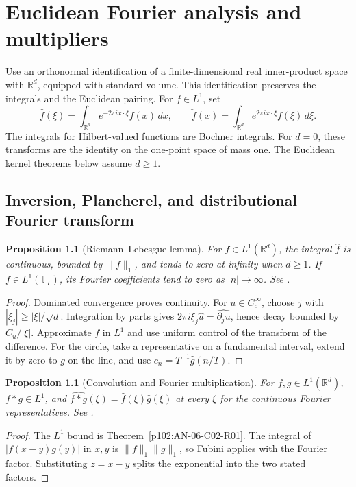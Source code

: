\documentclass[11pt,oneside,openany]{book}
\newtheorem{proposition}[theorem]{Proposition}
\theoremstyle{definition}
\theoremstyle{remark}
\begin{document}
\chapter{Euclidean Fourier analysis and multipliers}
\label{p102:chapter-u3}

Use an orthonormal identification of a finite-dimensional real inner-product space with \(\mathbb R^d\), equipped with standard volume. This identification preserves the integrals and the Euclidean pairing. For \(f\in L^1\), set
\[
 \widehat f(\xi)=\int_{\mathbb R^d}e^{-2\pi i x\cdot\xi}f(x)\,dx,
 \qquad
 \check f(x)=\int_{\mathbb R^d}e^{2\pi i x\cdot\xi}f(\xi)\,d\xi.
\]
The integrals for Hilbert-valued functions are Bochner integrals. For \(d=0\), these transforms are the identity on the one-point space of mass one. The Euclidean kernel theorems below assume \(d\ge1\).

\section{Inversion, Plancherel, and distributional Fourier transform}

\begin{proposition}[Riemann--Lebesgue lemma]
\label{p102:AN-06-C01-S01}
For \(f\in L^1(\mathbb R^d)\), the integral \(\widehat f\) is continuous, bounded by \(\|f\|_1\), and tends to zero at infinity when \(d\ge1\). If \(f\in L^1(\mathbb T_T)\), its Fourier coefficients tend to zero as \(|n|\to\infty\). See \cite[\S\S2.2.4 and 3.3.1]{grafakos}.
\end{proposition}
\begin{proof}
Dominated convergence proves continuity. For \(u\in C_c^\infty\), choose \(j\) with \(|\xi_j|\ge|\xi|/\sqrt d\). Integration by parts gives \(2\pi i\xi_j\widehat u=\widehat{\partial_j u}\), hence decay bounded by \(C_u/|\xi|\). Approximate \(f\) in \(L^1\) and use uniform control of the transform of the difference. For the circle, take a representative on a fundamental interval, extend it by zero to \(g\) on the line, and use \(c_n=T^{-1}\widehat g(n/T)\).
\end{proof}

\begin{proposition}[Convolution and Fourier multiplication]
\label{p102:AN-06-C02-S01}
For \(f,g\in L^1(\mathbb R^d)\), \(f*g\in L^1\), and
\(\widehat{f*g}(\xi)=\widehat f(\xi)\widehat g(\xi)\) at every \(\xi\) for the continuous Fourier representatives. See \cite[\S8.3]{folland}.
\end{proposition}
\begin{proof}
The \(L^1\) bound is Theorem~\ref{p102:AN-06-C02-R01}. The integral of \(|f(x-y)g(y)|\) in \(x,y\) is \(\|f\|_1\|g\|_1\), so Fubini applies with the Fourier factor. Substituting \(z=x-y\) splits the exponential into the two stated factors.
\end{proof}
\end{document}
